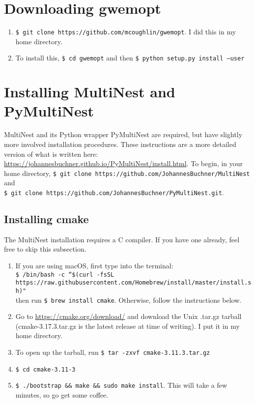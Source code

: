\documentclass[11pt]{article}
\begin{document}
\section{Downloading gwemopt}
\begin{enumerate}
	\item {\tt \$ git clone https://github.com/mcoughlin/gwemopt}. I did this in my home directory.
	\item To install this, {\tt \$ cd gwemopt} and then {\tt \$ python setup.py install --user}
\end{enumerate}

\section{Installing MultiNest and PyMultiNest}
MultiNest and its Python wrapper PyMultiNest are required, but have slightly more involved installation procedures. These instructions are a more detailed version of what is written here: \url{https://johannesbuchner.github.io/PyMultiNest/install.html}. To begin, in your home directory, {\tt \$ git clone https://github.com/JohannesBuchner/MultiNest} and \\{\tt \$ git clone https://github.com/JohannesBuchner/PyMultiNest.git}.

\subsection{Installing cmake}
The MultiNest installation requires a C compiler. If you have one already, feel free to skip this subsection.
\begin{enumerate}
    \item If you are using macOS, first type into the terminal: \\{\tt \$ /bin/bash -c ``\$(curl -fsSL https://raw.githubusercontent.com/Homebrew/install/master/install.sh)"} \\ then run {\tt \$ brew install cmake}. Otherwise, follow the instructions below.
	\item Go to \url{https://cmake.org/download/} and download the Unix .tar.gz tarball (cmake-3.17.3.tar.gz is the latest release at time of writing). I put it in my home directory.
	\item To open up the tarball, run {\tt \$ tar -zxvf cmake-3.11.3.tar.gz}
	\item {\tt \$ cd cmake-3.11-3}
	\item {\tt \$ ./bootstrap \&\& make \&\& sudo make install}. This will take a few minutes, so go get some coffee.
\end{enumerate}
\end{document}
